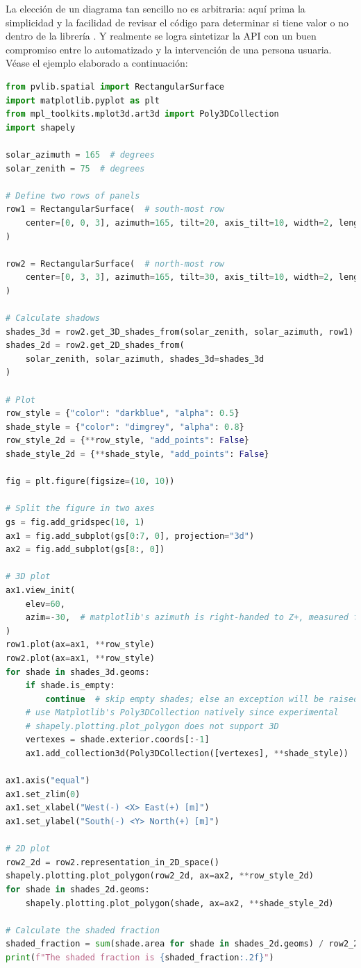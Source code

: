 La elección de un diagrama tan sencillo no es arbitraria: aquí prima la simplicidad y la facilidad de revisar el código para determinar si tiene valor o no dentro de la librería \pvlibpy. Y realmente se logra sintetizar la API con un buen compromiso entre lo automatizado y la intervención de una persona usuaria. Véase el ejemplo elaborado a continuación:

\begin{lstlisting}[language=Python, caption={Caso de uso de ejemplo para la propuesta de cálculo de sombras en 3D.}, label={lst:sombreado_3d}]
from pvlib.spatial import RectangularSurface
import matplotlib.pyplot as plt
from mpl_toolkits.mplot3d.art3d import Poly3DCollection
import shapely

solar_azimuth = 165  # degrees
solar_zenith = 75  # degrees

# Define two rows of panels
row1 = RectangularSurface(  # south-most row
    center=[0, 0, 3], azimuth=165, tilt=20, axis_tilt=10, width=2, length=20
)

row2 = RectangularSurface(  # north-most row
    center=[0, 3, 3], azimuth=165, tilt=30, axis_tilt=10, width=2, length=20
)

# Calculate shadows
shades_3d = row2.get_3D_shades_from(solar_zenith, solar_azimuth, row1)
shades_2d = row2.get_2D_shades_from(
    solar_zenith, solar_azimuth, shades_3d=shades_3d
)

# Plot
row_style = {"color": "darkblue", "alpha": 0.5}
shade_style = {"color": "dimgrey", "alpha": 0.8}
row_style_2d = {**row_style, "add_points": False}
shade_style_2d = {**shade_style, "add_points": False}

fig = plt.figure(figsize=(10, 10))

# Split the figure in two axes
gs = fig.add_gridspec(10, 1)
ax1 = fig.add_subplot(gs[0:7, 0], projection="3d")
ax2 = fig.add_subplot(gs[8:, 0])

# 3D plot
ax1.view_init(
    elev=60,
    azim=-30,  # matplotlib's azimuth is right-handed to Z+, measured from X+
)
row1.plot(ax=ax1, **row_style)
row2.plot(ax=ax1, **row_style)
for shade in shades_3d.geoms:
    if shade.is_empty:
        continue  # skip empty shades; else an exception will be raised
    # use Matplotlib's Poly3DCollection natively since experimental
    # shapely.plotting.plot_polygon does not support 3D
    vertexes = shade.exterior.coords[:-1]
    ax1.add_collection3d(Poly3DCollection([vertexes], **shade_style))

ax1.axis("equal")
ax1.set_zlim(0)
ax1.set_xlabel("West(-) <X> East(+) [m]")
ax1.set_ylabel("South(-) <Y> North(+) [m]")

# 2D plot
row2_2d = row2.representation_in_2D_space()
shapely.plotting.plot_polygon(row2_2d, ax=ax2, **row_style_2d)
for shade in shades_2d.geoms:
    shapely.plotting.plot_polygon(shade, ax=ax2, **shade_style_2d)

# Calculate the shaded fraction
shaded_fraction = sum(shade.area for shade in shades_2d.geoms) / row2_2d.area
print(f"The shaded fraction is {shaded_fraction:.2f}")
\end{lstlisting}

